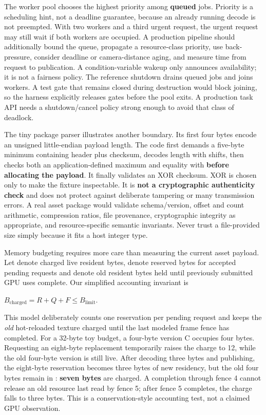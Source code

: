 The worker pool chooses the highest priority among \textbf{queued} jobs. Priority is a scheduling hint, not a deadline guarantee, because an already running decode is not preempted. With two workers and a third urgent request, the urgent request may still wait if both workers are occupied. A production pipeline should additionally bound the queue, propagate a resource-class priority, use back-pressure, consider deadline or camera-distance aging, and measure time from request to publication. A condition-variable wakeup only announces availability; it is not a fairness policy. The reference shutdown drains queued jobs and joins workers. A test gate that remains closed during destruction would block joining, so the harness explicitly releases gates before the pool exits. A production task API needs a shutdown/cancel policy strong enough to avoid that class of deadlock.

The tiny package parser illustrates another boundary. Its first four bytes encode an unsigned little-endian payload length. The code first demands a five-byte minimum containing header plus checksum, decodes length with shifts, then checks both an application-defined maximum and equality with  \textbf{before allocating the payload}. It finally validates an XOR checksum. XOR is chosen only to make the fixture inspectable. It is \textbf{not a cryptographic authenticity check} and does not protect against deliberate tampering or many transmission errors. A real asset package would validate schema/version, offset and count arithmetic, compression ratios, file provenance, cryptographic integrity as appropriate, and resource-specific semantic invariants. Never trust a file-provided size simply because it fits a host integer type.

Memory budgeting requires more care than measuring the current asset payload. Let  denote charged live resident bytes,  denote reserved bytes for accepted pending requests and  denote old resident bytes held until previously submitted GPU uses complete. Our simplified accounting invariant is

\(B_{\mathrm{charged}} = R+Q+F \le B_{\mathrm{limit}}.\)

This model deliberately counts one reservation per pending request and keeps the \emph{old} hot-reloaded texture charged until the last modeled frame fence has completed. For a 32-byte toy budget, a four-byte version C occupies four bytes. Requesting an eight-byte replacement temporarily raises the charge to 12, while the old four-byte version is still live. After decoding three bytes and publishing, the eight-byte reservation becomes three bytes of new residency, but the old four bytes remain in : \textbf{seven bytes} are charged. A completion through fence 4 cannot release an old resource last read by fence 5; after fence 5 completes, the charge falls to three bytes. This is a conservation-style accounting test, not a claimed GPU observation.

